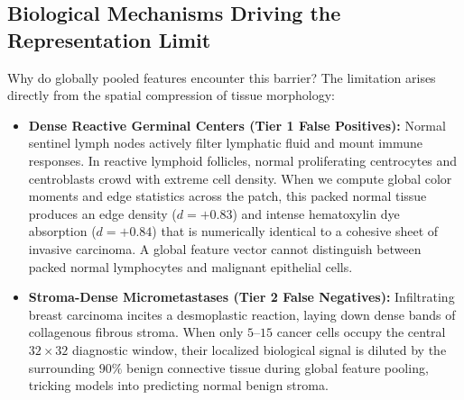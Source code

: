 \documentclass[11pt,a4paper]{article}
\begin{document}
\subsection{Biological Mechanisms Driving the Representation Limit}
Why do globally pooled features encounter this barrier? The limitation arises directly from the spatial compression of tissue morphology:
\begin{itemize}[leftmargin=*]
    \item \textbf{Dense Reactive Germinal Centers (Tier 1 False Positives):}
    Normal sentinel lymph nodes actively filter lymphatic fluid and mount immune responses. In reactive lymphoid follicles, normal proliferating centrocytes and centroblasts crowd with extreme cell density. When we compute global color moments and edge statistics across the patch, this packed normal tissue produces an edge density ($d = +0.83$) and intense hematoxylin dye absorption ($d = +0.84$) that is numerically identical to a cohesive sheet of invasive carcinoma. A global feature vector cannot distinguish between packed normal lymphocytes and malignant epithelial cells.
    
    \item \textbf{Stroma-Dense Micrometastases (Tier 2 False Negatives):}
    Infiltrating breast carcinoma incites a desmoplastic reaction, laying down dense bands of collagenous fibrous stroma. When only $5$--$15$ cancer cells occupy the central $32 \times 32$ diagnostic window, their localized biological signal is diluted by the surrounding $90\%$ benign connective tissue during global feature pooling, tricking models into predicting normal benign stroma.
\end{itemize}
\end{document}
